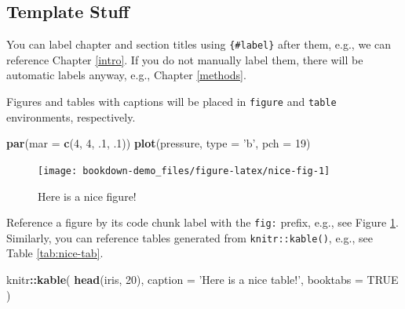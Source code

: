 \documentclass[]{book}
\newenvironment{Shaded}{\begin{snugshade}}{\end{snugshade}}
\newcommand{\KeywordTok}[1]{\textcolor[rgb]{0.13,0.29,0.53}{\textbf{#1}}}
\newcommand{\DataTypeTok}[1]{\textcolor[rgb]{0.13,0.29,0.53}{#1}}
\newcommand{\DecValTok}[1]{\textcolor[rgb]{0.00,0.00,0.81}{#1}}
\newcommand{\StringTok}[1]{\textcolor[rgb]{0.31,0.60,0.02}{#1}}
\newcommand{\OtherTok}[1]{\textcolor[rgb]{0.56,0.35,0.01}{#1}}
\newcommand{\OperatorTok}[1]{\textcolor[rgb]{0.81,0.36,0.00}{\textbf{#1}}}
\newcommand{\NormalTok}[1]{#1}
\theoremstyle{definition}
\theoremstyle{definition}
\theoremstyle{definition}
\theoremstyle{remark}
\begin{document}
\subsection{Template Stuff}\label{template-stuff}

You can label chapter and section titles using \texttt{\{\#label\}}
after them, e.g., we can reference Chapter \ref{intro}. If you do not
manually label them, there will be automatic labels anyway, e.g.,
Chapter \ref{methods}.

Figures and tables with captions will be placed in \texttt{figure} and
\texttt{table} environments, respectively.

\begin{Shaded}
\begin{Highlighting}[]
\KeywordTok{par}\NormalTok{(}\DataTypeTok{mar =} \KeywordTok{c}\NormalTok{(}\DecValTok{4}\NormalTok{, }\DecValTok{4}\NormalTok{, .}\DecValTok{1}\NormalTok{, .}\DecValTok{1}\NormalTok{))}
\KeywordTok{plot}\NormalTok{(pressure, }\DataTypeTok{type =} \StringTok{'b'}\NormalTok{, }\DataTypeTok{pch =} \DecValTok{19}\NormalTok{)}
\end{Highlighting}
\end{Shaded}

\begin{figure}

{\centering \texttt{[image: bookdown-demo\_files/figure-latex/nice-fig-1]} 

}

\caption{Here is a nice figure!}\label{fig:nice-fig}
\end{figure}

Reference a figure by its code chunk label with the \texttt{fig:}
prefix, e.g., see Figure \ref{fig:nice-fig}. Similarly, you can
reference tables generated from \texttt{knitr::kable()}, e.g., see Table
\ref{tab:nice-tab}.

\begin{Shaded}
\begin{Highlighting}[]
\NormalTok{knitr}\OperatorTok{::}\KeywordTok{kable}\NormalTok{(}
  \KeywordTok{head}\NormalTok{(iris, }\DecValTok{20}\NormalTok{), }\DataTypeTok{caption =} \StringTok{'Here is a nice table!'}\NormalTok{,}
  \DataTypeTok{booktabs =} \OtherTok{TRUE}
\NormalTok{)}
\end{Highlighting}
\end{Shaded}
\end{document}
